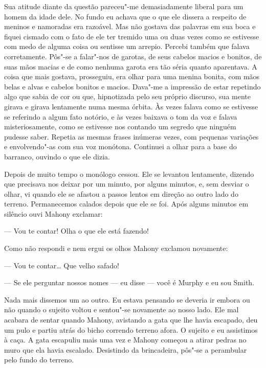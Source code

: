Sua atitude diante da questão pareceu"-me demasiadamente liberal para um homem
da idade dele.  No fundo eu achava que o que ele dissera a respeito de meninos
e namoradas era razoável.  Mas não gostava das palavras em sua boca e fiquei
cismado com o fato de ele ter tremido uma ou duas vezes como se estivesse com
medo de alguma coisa ou sentisse um arrepio.  Percebi também que falava
corretamente.  Pôs"-se a falar"-nos de garotas, de seus cabelos macios e bonitos,
de suas mãos macias e de como nenhuma garota era tão séria quanto aparentava.
A coisa que mais gostava, prosseguiu, era olhar para uma menina bonita, com
mãos belas e alvas e cabelos bonitos e macios.  Dava"-me a impressão de estar
repetindo algo que sabia de cor ou que, hipnotizada pelo seu próprio discurso,
sua mente girava e girava lentamente numa mesma órbita.  Às vezes falava como
se estivesse se referindo a algum fato notório, e às vezes baixava o tom da voz
e falava misteriosamente, como se estivesse nos contando um segredo que ninguém
pudesse saber.  Repetia as mesmas frases inúmeras vezes, com pequenas variações
e envolvendo"-as com sua voz monótona.  Continuei a olhar para a base do
barranco, ouvindo o que ele dizia.

Depois de muito tempo o monólogo cessou.  Ele se levantou lentamente, dizendo
que precisava nos deixar por um minuto, por alguns minutos, e, sem desviar o
olhar, vi quando ele se afastou a passos lentos em direção ao outro lado do
terreno.  Permanecemos calados depois que ele se foi.  Após alguns minutos em
silêncio ouvi Mahony exclamar:

--- Vou te contar!  Olha o que ele está fazendo!

Como não respondi e nem ergui os olhos Mahony exclamou novamente:

--- Vou te contar\ldots{} Que velho safado!

--- Se ele perguntar nossos nomes --- eu disse --- você é Murphy e eu sou
Smith.

Nada mais dissemos um ao outro.  Eu estava pensando se deveria ir embora ou não
quando o sujeito voltou e sentou"-se novamente ao nosso lado.  Ele mal acabara
de sentar quando Mahony, avistando a gata que lhe havia escapado, deu um pulo e
partiu atrás do bicho correndo terreno afora.  O sujeito e eu assistimos à
caça.  A gata escapuliu mais uma vez e Mahony começou a atirar pedras no muro
que ela havia escalado.  Desistindo da brincadeira, pôs"-se a perambular pelo
fundo do terreno.

